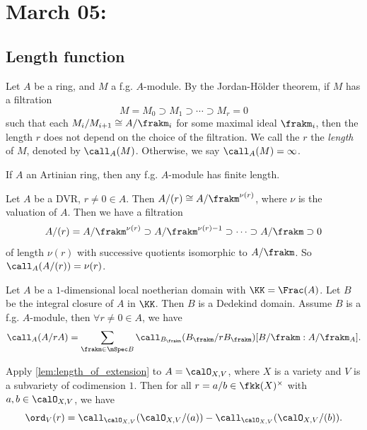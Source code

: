 \section{March 05:}

\subsection{Length function}

    Let \(A\) be a ring, and \(M\) a f.g. \(A\)-module. 
    By the Jordan-Hölder theorem, if \(M\) has a filtration 
    \[
        M = M_0 \supset M_1 \supset \cdots \supset M_r = 0
    \]
    such that each \(M_i/M_{i+1} \cong A/\frakm_i\) for some maximal ideal \(\frakm_i\), 
    then the length \(r\) does not depend on the choice of the filtration.
    We call the \(r\) the \emph{length} of \(M\), denoted by \(\call_A(M)\).
    Otherwise, we say \(\call_A(M) = \infty\).

    If \(A\) an Artinian ring, then any f.g. \(A\)-module has finite length.

    \begin{example}
        Let \(A\) be a DVR, \(r \neq 0 \in A\).
        Then \(A/(r) \cong A/\frakm^{\nu(r)}\), where \(\nu\) is the valuation of \(A\).
        Then we have a filtration
        \[
            A/(r) = A/\frakm^{\nu(r)} \supset A/\frakm^{\nu(r)-1} \supset \cdots \supset A/\frakm \supset 0
        \]
        of length \(\nu(r)\) with successive quotients isomorphic to \(A/\frakm\).
        So \(\call_A(A/(r)) = \nu(r)\).
    \end{example}

    \begin{lemma}\label{lem:length_of_extension}
        Let \(A\) be a \(1\)-dimensional local noetherian domain with \(\KK = \Frac(A)\).
        Let \(B\) be the integral closure of \(A\) in \(\KK\).
        Then \(B\) is a Dedekind domain.
        Assume \(B\) is a f.g. \(A\)-module, then \(\forall r \neq 0 \in A\), we have 
        \[ \call_A(A/rA) = \sum_{\frakm \in \mSpec B} \call_{B_\frakm}(B_\frakm/rB_\frakm)[B/\frakm : A/\frakm_A]. \]
    \end{lemma}

    Apply \cref{lem:length_of_extension} to \(A = \calO_{X,V}\), where \(X\) is a variety and \(V\) is a subvariety of codimension \(1\).
    Then for all \(r = a/b \in \fkk(X)^\times\) with \(a,b \in \calO_{X,V}\), we have
    \[ \ord_V(r) = \call_{\calO_{X,V}}(\calO_{X,V}/(a)) - \call_{\calO_{X,V}}(\calO_{X,V}/(b)). \]

